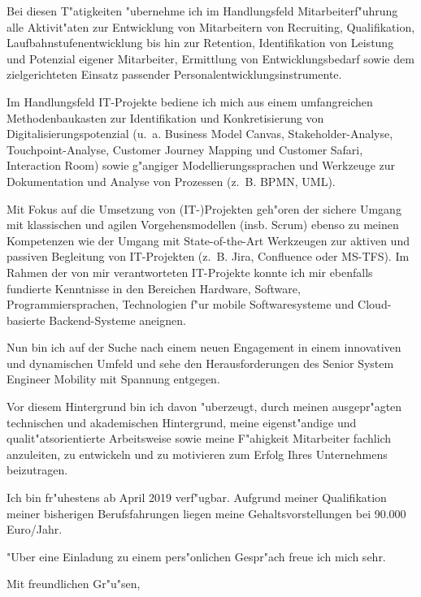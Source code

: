 \documentclass[10pt,a4paper]{dinbrief}
\begin{document}
\begin{letter}
Bei diesen T"atigkeiten "ubernehme ich im Handlungsfeld Mitarbeiterf"uhrung alle Aktivit"aten zur Entwicklung von Mitarbeitern von Recruiting, Qualifikation, Laufbahnstufenentwicklung bis hin zur Retention, Identifikation von Leistung und Potenzial eigener Mitarbeiter, Ermittlung von Entwicklungsbedarf sowie dem zielgerichteten Einsatz passender Personalentwicklungsinstrumente.

Im Handlungsfeld IT-Projekte bediene ich mich aus einem umfangreichen Methodenbaukasten zur Identifikation und Konkretisierung von Digitalisierungspotenzial (u.~a. Business Model Canvas, Stakeholder-Analyse, Touchpoint-Analyse, Customer Journey Mapping und Customer Safari, Interaction Room) sowie g"angiger Modellierungssprachen und Werkzeuge zur Dokumentation und Analyse von Prozessen (z.~B. BPMN, UML).

Mit Fokus auf die Umsetzung von (IT-)Projekten geh"oren der sichere Umgang mit klassischen und agilen Vorgehensmodellen (insb. Scrum) ebenso zu meinen Kompetenzen wie der Umgang mit State-of-the-Art Werkzeugen zur aktiven und passiven Begleitung von IT-Projekten (z.~B. Jira, Confluence oder MS-TFS). Im Rahmen der von mir verantworteten IT-Projekte konnte ich mir ebenfalls fundierte Kenntnisse in den Bereichen Hardware, Software, Programmiersprachen, Technologien f"ur mobile Softwaresysteme und Cloud-basierte Backend-Systeme aneignen.

Nun bin ich auf der Suche nach einem neuen Engagement in einem innovativen und dynamischen Umfeld und sehe den Herausforderungen des Senior System Engineer Mobility mit Spannung entgegen.

Vor diesem Hintergrund bin ich davon "uberzeugt, durch meinen ausgepr"agten technischen und akademischen Hintergrund, meine eigenst"andige und qualit"atsorientierte Arbeitsweise sowie meine F"ahigkeit Mitarbeiter fachlich anzuleiten, zu entwickeln und zu motivieren zum Erfolg Ihres Unternehmens beizutragen.

Ich bin fr"uhestens ab April 2019 verf"ugbar. Aufgrund meiner Qualifikation meiner bisherigen Berufsfahrungen liegen meine Gehaltsvorstellungen bei 90.000 Euro/Jahr. 

"Uber eine Einladung zu einem pers"onlichen Gespr"ach freue ich mich sehr.

\closing{Mit freundlichen Gr"u"sen,}
\end{letter}
\end{document}
